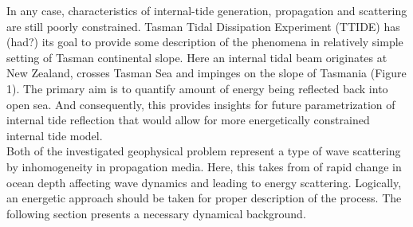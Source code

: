 In any case, characteristics of internal-tide generation, propagation and scattering are still poorly constrained. Tasman Tidal Dissipation Experiment (TTIDE) has (had?) its goal to provide some description of the phenomena in relatively simple setting of Tasman continental slope. Here an internal tidal beam originates at New Zealand, crosses Tasman Sea and impinges on the slope of Tasmania (Figure 1). The primary aim is to quantify amount of energy being reflected back into open sea. And consequently, this provides insights for future parametrization of internal tide reflection that would allow for more energetically constrained internal tide model.\\
Both of the investigated geophysical problem represent a type of wave scattering by inhomogeneity in propagation media. Here, this takes from of rapid change in ocean depth affecting wave dynamics and leading to energy scattering. Logically, an energetic approach should be taken for proper description of the process. The following section presents a necessary dynamical background.\\

\newpage

